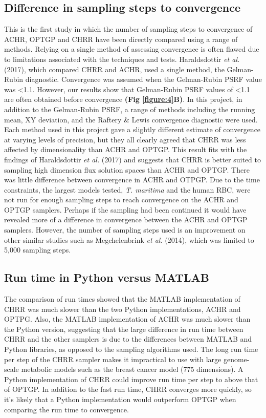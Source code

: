 \documentclass[10pt,letterpaper]{article}
\begin{document}
\subsection*{Difference in sampling steps to convergence}
This is the first study in which the number of sampling steps to convergence of ACHR, OPTGP and CHRR have been directly compared using a range of methods. Relying on a single method of assessing convergence is often flawed due to limitations associated with the techniques and tests\cite{Cowles}. Haraldsdottir \textit{et al.} (2017), which compared CHRR and ACHR, used a single method, the Gelman-Rubin diagnostic. Convergence was assumed when the Gelman-Rubin PSRF value was \textless{}1.1\cite{Haraldsdottir}. However, our results show that Gelman-Rubin PSRF values of \textless{}1.1 are often obtained before convergence \textbf{(Fig \ref{figure:4}B)}. In this project, in addition to the Gelman-Rubin PSRF, a range of methods including the running mean, XY deviation, and the Raftery \& Lewis convergence diagnostic were used. Each method used in this project gave a slightly different estimate of convergence at varying levels of precision, but they all clearly agreed that CHRR was less affected by dimensionality than ACHR and OPTGP. This result fits with the findings of Haraldsdottir \textit{et al.} (2017) and suggests that CHRR is better suited to sampling high dimension flux solution spaces than ACHR and OPTGP\cite{Haraldsdottir}. There was little difference between convergence in ACHR and OTPGP. Due to the time constraints, the largest models tested, \textit{T. maritima} and the human RBC, were not run for enough sampling steps to reach convergence on the ACHR and OPTGP samplers. Perhaps if the sampling had been continued it would have revealed more of a difference in convergence between the ACHR and OPTGP samplers. However, the number of sampling steps used is an improvement on other similar studies such as Megchelenbrink \textit{et al.} (2014), which was limited to 5,000 sampling steps\cite{Megchelenbrink}. 

\subsection*{Run time in Python versus MATLAB}
The comparison of run times showed that the MATLAB implementation of CHRR was much slower than the two Python implementations, ACHR and OPTPG. Also, the MATLAB implementation of ACHR was much slower than the Python version, suggesting that the large difference in run time between CHRR and the other samplers is due to the differences between MATLAB and Python libraries, as opposed to the sampling algorithms used. The long run time per step of the CHRR sampler makes it impractical to use with large genome-scale metabolic models such as the breast cancer model (775 dimensions). A Python implementation of CHRR could improve run time per step to above that of OPTGP. In addition to the fast run time, CHRR converges more quickly, so it’s likely that a Python implementation would outperform OPTGP when comparing the run time to convergence.  
\end{document}
